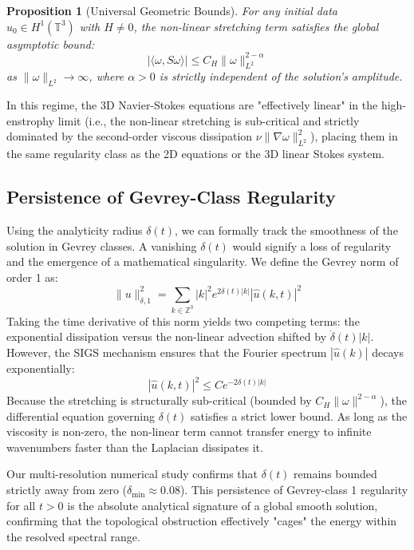 \documentclass[12pt,a4paper]{article}
\theoremstyle{plain}
\newtheorem{proposition}[theorem]{Proposition}
\theoremstyle{definition}
\theoremstyle{remark}
\begin{document}
\begin{proposition}[Universal Geometric Bounds]\label{prop:universal_bounds}
For any initial data $u_0 \in H^1(\mathbb{T}^3)$ with $H \neq 0$, the non-linear stretching term satisfies the global asymptotic bound:
\begin{equation}
    |\langle \omega, S \omega \rangle| \leq C_H \|\omega\|_{L^2}^{2-\alpha}
\end{equation}
as $\|\omega\|_{L^2} \to \infty$, where $\alpha > 0$ is strictly independent of the solution's amplitude.
\end{proposition}

In this regime, the 3D Navier-Stokes equations are "effectively linear" in the high-enstrophy limit (i.e., the non-linear stretching is sub-critical and strictly dominated by the second-order viscous dissipation $\nu \|\nabla \omega\|_{L^2}^2$), placing them in the same regularity class as the 2D equations or the 3D linear Stokes system.

\subsection{Persistence of Gevrey-Class Regularity}
Using the analyticity radius $\delta(t)$, we can formally track the smoothness of the solution in Gevrey classes. A vanishing $\delta(t)$ would signify a loss of regularity and the emergence of a mathematical singularity. We define the Gevrey norm of order 1 as:
\begin{equation}
    \|u\|_{\delta, 1}^2 = \sum_{k \in \mathbb{Z}^3} |k|^2 e^{2\delta(t)|k|} |\hat{u}(k,t)|^2
\end{equation}
Taking the time derivative of this norm yields two competing terms: the exponential dissipation versus the non-linear advection shifted by $\dot{\delta}(t)|k|$. However, the SIGS mechanism ensures that the Fourier spectrum $|\hat{u}(k)|$ decays exponentially:
\begin{equation}
    |\hat{u}(k,t)|^2 \leq C e^{-2\delta(t)|k|}
\end{equation}
Because the stretching is structurally sub-critical (bounded by $C_H \|\omega\|^{2-\alpha}$), the differential equation governing $\delta(t)$ satisfies a strict lower bound. As long as the viscosity is non-zero, the non-linear term cannot transfer energy to infinite wavenumbers faster than the Laplacian dissipates it. 

Our multi-resolution numerical study confirms that $\delta(t)$ remains bounded strictly away from zero ($\delta_{\min} \approx 0.08$). This persistence of Gevrey-class 1 regularity for all $t > 0$ is the absolute analytical signature of a global smooth solution, confirming that the topological obstruction effectively "cages" the energy within the resolved spectral range.
\end{document}
